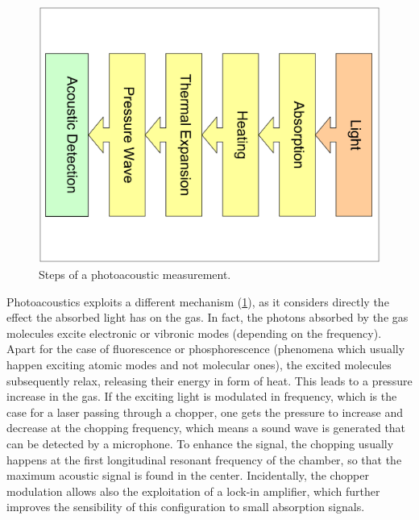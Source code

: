 \begin{figure}\centering
\includegraphics[width=\linewidth, angle=90, draft=false]{eps/photoacoustics.eps}
\caption{Steps of a photoacoustic measurement.}
\label{photoacoustics}
\end{figure}
Photoacoustics exploits a different mechanism (\cref{photoacoustics}), as it considers directly the effect the absorbed light has on the gas. In fact, the photons absorbed by the gas molecules excite electronic or vibronic modes (depending on the frequency). Apart for the case of fluorescence or phosphorescence (phenomena which usually happen exciting atomic modes and not molecular ones), the excited molecules subsequently relax, releasing their energy in form of heat. This leads to a pressure increase in the gas. If the exciting light is modulated in frequency, which is the case for a laser passing through a chopper, one gets the pressure to increase and decrease at the chopping frequency, which means a sound wave is generated that can be detected by a microphone. 
To enhance the signal, the chopping usually happens at the first longitudinal resonant frequency of the chamber, so that the maximum acoustic signal is found in the center. Incidentally, the chopper modulation allows also the exploitation of a lock-in amplifier, which further improves the sensibility of this configuration to small absorption signals.